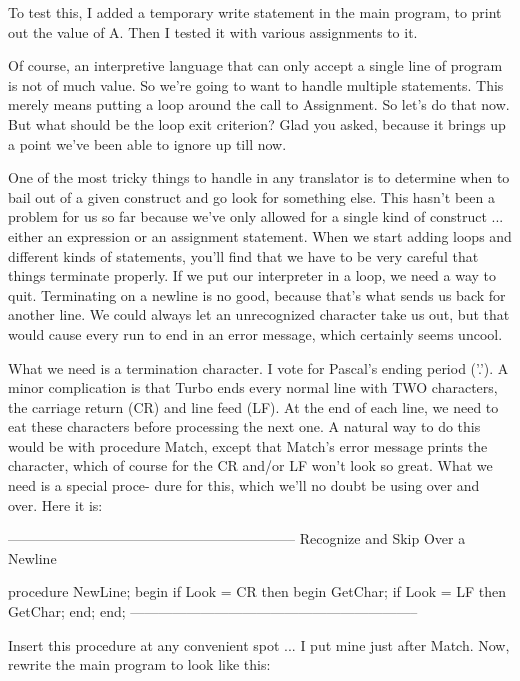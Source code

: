 \documentclass[float=false, crop=false]{standalone}
\begin{document}
To test this, I added a temporary write statement in the main program, to print
out the value of A. Then I tested it with various assignments to it.

Of course, an interpretive language that can only accept a single line of
program is not of much value. So we're going to want to handle multiple
statements. This merely means putting a loop around the call to Assignment. So
let's do that now. But what should be the loop exit criterion? Glad you asked,
because it brings up a point we've been able to ignore up till now.

One of the most tricky things to handle in any translator is to determine when
to bail out of a given construct and go look for something else. This hasn't
been a problem for us so far because we've only allowed for a single kind of
construct ... either an expression or an assignment statement. When we start
adding loops and different kinds of statements, you'll find that we have to be
very careful that things terminate properly. If we put our interpreter in a
loop, we need a way to quit. Terminating on a newline is no good, because that's
what sends us back for another line. We could always let an unrecognized
character take us out, but that would cause every run to end in an error
message, which certainly seems uncool.

What we need is a termination character. I vote for Pascal's ending period
('.'). A minor complication is that Turbo ends every normal line with TWO
characters, the carriage return (CR) and line feed (LF). At the end of each
line, we need to eat these characters before processing the next one. A natural
way to do this would be with procedure Match, except that Match's error message
prints the character, which of course for the CR and/or LF won't look so great.
What we need is a special proce- dure for this, which we'll no doubt be using
over and over. Here it is:

\begin{code}
{--------------------------------------------------------------}
{ Recognize and Skip Over a Newline }

procedure NewLine;
begin
   if Look = CR then begin
      GetChar;
      if Look = LF then
         GetChar;
   end;
end;
{--------------------------------------------------------------}
\end{code}

Insert this procedure at any convenient spot ... I put  mine just
after Match.  Now, rewrite the main program to look like this:
\end{document}

